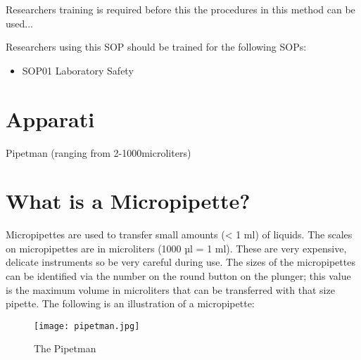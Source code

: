 \documentclass[12pt]{../SOP3_beta}\usepackage[]{graphicx}\usepackage[]{color}
\begin{document}
\NP Researchers training is required before this the procedures in this method can be used... 

\NP Researchers using this SOP should be trained for the following SOPs:

\begin{itemize}
  \item SOP01 Laboratory Safety
\end{itemize} 

\section{Apparati}

\NP Pipetman (ranging from 2-1000microliters)
\section {What is a Micropipette?}
Micropipettes are used to transfer small amounts (< 1 ml) of liquids. The scales on micropipettes are in microliters (1000 µl = 1 ml). These are very expensive, delicate instruments so be very careful during use. The sizes of the micropipettes can be identified via the number on the round button on the plunger; this value is the maximum volume in microliters that can be transferred with that size pipette. The following is an illustration of a micropipette:
\begin{figure} [H!]
\caption{The Pipetman}
\texttt{[image: pipetman.jpg]}
\end{figure}
\end{document}
